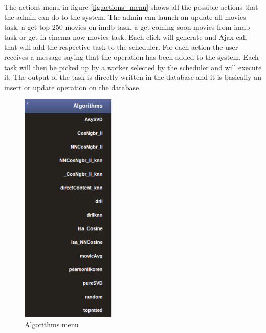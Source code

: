 The actions menu in figure \ref{fig:actions_menu} shows all the possible actions that the admin can do to the system. The admin can launch an update all movies task, a get top 250 movies on imdb task, a get coming soon movies from imdb task or get in cinema now movies task. Each click will generate and Ajax \cite{ajax} call that will add the respective task to the scheduler. For each action the user receives a message saying that the operation has been added to the system. Each task will then be picked up by a worker selected by the scheduler and will execute it. The output of the task is directly written in the database and it is basically an insert or update operation on the database.

\begin{figure}
  \centering
  \includegraphics[width=0.4\textwidth]{figures/algorithms_menu.png}
  \caption{Algorithms menu}
  \label{fig:algorithms_menu}
\end{figure}

